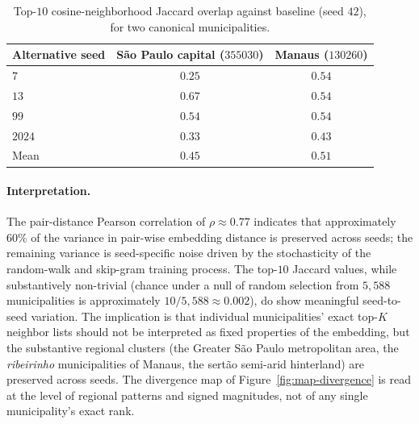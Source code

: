 \begin{table}[h!]
\centering
\caption{Top-$10$ cosine-neighborhood Jaccard overlap against baseline
(seed $42$), for two canonical municipalities.}
\label{tab:stab-jaccard}
\small
\begin{tabular}{lcc}
\toprule
Alternative seed & São Paulo capital ($355030$) & Manaus ($130260$) \\
\midrule
$7$    & $0.25$ & $0.54$ \\
$13$   & $0.67$ & $0.54$ \\
$99$   & $0.54$ & $0.54$ \\
$2024$ & $0.33$ & $0.43$ \\
\midrule
Mean   & $0.45$ & $0.51$ \\
\bottomrule
\end{tabular}
\end{table}

\paragraph{Interpretation.} The pair-distance Pearson correlation of
$\rho \approx 0.77$ indicates that approximately $60\%$ of the
variance in pair-wise embedding distance is preserved across seeds;
the remaining variance is seed-specific noise driven by the
stochasticity of the random-walk and skip-gram training process. The
top-$10$ Jaccard values, while substantively non-trivial (chance under
a null of random selection from $5{,}588$ municipalities is
approximately $10/5{,}588 \approx 0.002$), do show meaningful
seed-to-seed variation. The implication is that individual
municipalities' exact top-$K$ neighbor lists should not be interpreted
as fixed properties of the embedding, but the substantive regional
clusters (the Greater São Paulo metropolitan area, the
\emph{ribeirinho} municipalities of Manaus, the sertão semi-arid
hinterland) are preserved across seeds. The divergence map of
Figure~\ref{fig:map-divergence} is read at the level of regional
patterns and signed magnitudes, not of any single municipality's exact
rank.

